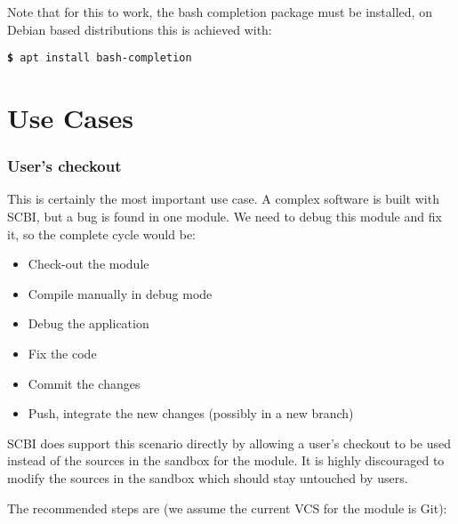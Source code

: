 \documentclass[a4paper,12pt,twoside]{article}
\newcommand{\cmd}[1]{\tabto{1cm}\hspace{0.5cm}\texttt{\textbf{\$} #1}}
\let\stdsection\section
\renewcommand\section{\newpage\stdsection}
\begin{document}
Note that for this to work, the bash completion package must be installed, on Debian based distributions this is achieved with:

\cmd{apt install bash-completion}


\section{Use Cases}

\subsubsection{User's checkout}
\label{userco}

This is certainly the most important use case. A complex software is built with SCBI, but a bug is found in one module. We need to debug this module and fix it, so the complete cycle would be:

\begin{itemize}
	\item Check-out the module
	\item Compile manually in debug mode
	\item Debug the application
	\item Fix the code
	\item Commit the changes
	\item Push, integrate the new changes (possibly in a new branch)
\end{itemize}

SCBI does support this scenario directly by allowing a user's checkout to be used instead of the sources in the sandbox for the module. It is highly discouraged to modify the sources in the sandbox which should stay untouched by users.

The recommended steps are (we assume the current VCS for the module is Git):
\end{document}
